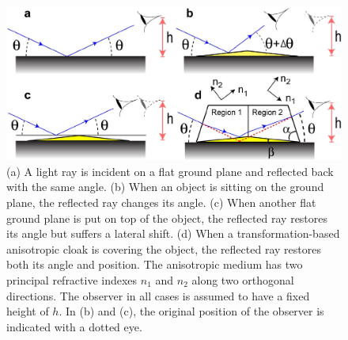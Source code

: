 \documentclass[preprint,preprintnumbers,amsmath,amssymb]{revtex4}
\begin{document}
\newpage

\begin{figure}
\begin{centering}
\includegraphics[width=1\columnwidth,draft=false]{Fig_1}%
\caption{\label{fig:rays2}  (a) A light ray is incident on a
flat ground plane and reflected back with the same angle.
(b) When an object is sitting on the ground plane, the
reflected ray changes its angle. (c) When another flat
ground plane is put on top of the object, the reflected ray restores
its angle but suffers a lateral shift. (d) When a
transformation-based anisotropic cloak is covering the object, the
reflected ray restores both its angle and position. The anisotropic
medium has two principal refractive indexes $n_1$ and $n_2$ along
two orthogonal directions. The observer in all cases is assumed to
have a fixed height of $h$. In (b) and (c), the
original position of the observer is indicated with a dotted eye.}
\end{centering}
\end{figure}
\end{document}
